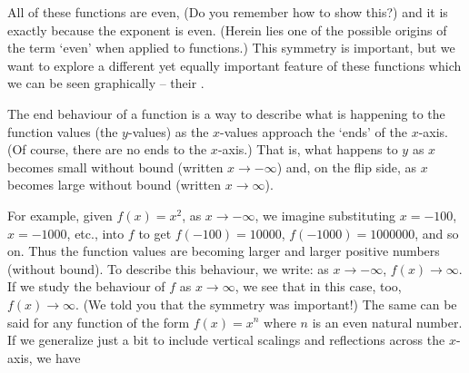 All of these functions are even, (Do you remember how to show this?) and it is exactly because the exponent is even. (Herein lies one of the possible origins of the term `even' when applied to functions.) This symmetry is important, but we want to explore a different yet equally important feature of these functions which we can be seen graphically -- their .  

\pagebreak

The end behaviour of a function is a way to describe what is happening to the function values (the $y$-values) as the $x$-values approach the `ends' of the $x$-axis. (Of course, there are no ends to the $x$-axis.) That is, what happens to $y$ as $x$ becomes small without bound (written $x \rightarrow -\infty$) and, on the flip side, as $x$ becomes large without bound (written $x \rightarrow \infty$).  




\smallskip

For example, given $f(x) = x^2$, as $x \rightarrow -\infty$, we imagine substituting $x=-100$, $x=-1000$, etc., into $f$ to get $f(-100)=10000$, $f(-1000)=1000000$, and so on. Thus  the function values are becoming larger and larger positive numbers (without bound).  To describe this behaviour, we write: as $x \rightarrow -\infty$, $f(x) \rightarrow \infty$.  If we study the behaviour of $f$ as $x \rightarrow \infty$, we see that in this case, too, $f(x) \rightarrow \infty$. (We told you that the symmetry was important!) The same can be said for any function of the form $f(x) = x^n$ where $n$ is an even natural number.   If we generalize just a bit to include vertical scalings and reflections across the $x$-axis,  we have





\smallskip

